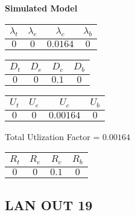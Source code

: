 \documentclass{article}
\begin{document}
\begin{minipage}{0.5\textwidth}
\centering	\textbf{Simulated Model}
\begin{table}[H]
\centering
\begin{tabular}{@{}cccc@{}}
\toprule
$\lambda_t$ & $\lambda_e$ & $\lambda_c$ & $\lambda_b$\\
\midrule
$0$ & $0$ & $0.0164$ & $0$\\
\bottomrule
\end{tabular}
\end{table}
\begin{table}[H]
\centering
\begin{tabular}{@{}cccc@{}}
\toprule
$D_t$ & $D_e$ & $D_c$ & $D_b$\\
\midrule
$0$ & $0$ & $0.1$ & $0$\\
\bottomrule
\end{tabular}
\end{table}\begin{table}[H]
\centering
\begin{tabular}{@{}cccc@{}}
\toprule
$U_t$ & $U_e$ & $U_c$ & $U_b$\\
\midrule
$0$ & $0$ & $0.00164$ & $0$\\
\bottomrule
\end{tabular}
\end{table}
\centering Total Utlization Factor = $0.00164$
\begin{table}[H]
\centering
\begin{tabular}{@{}cccc@{}}
\toprule
$R_t$ & $R_e$ & $R_c$ & $R_b$\\
\midrule
$0$ & $0$ & $0.1$ & $0$\\
\bottomrule
\end{tabular}
\end{table}
\end{minipage}\subsection{LAN OUT 19}
\end{document}
